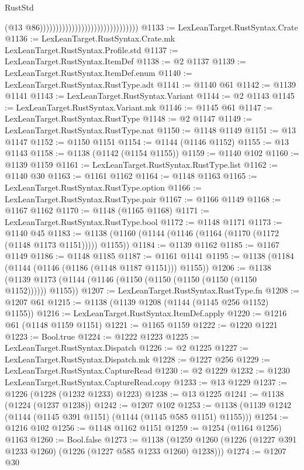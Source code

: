 \begin{lexlean}{RustStd}
\begin{coremodule}
                                                                (@13
                                                                  @86)))))))))))))))))))))))))))))))
@1133 := LexLeanTarget.RustSyntax.Crate
@1136 := LexLeanTarget.RustSyntax.Crate.mk LexLeanTarget.RustSyntax.Profile.std
@1137 := LexLeanTarget.RustSyntax.ItemDef
@1138 := @2 @1137
@1139 := LexLeanTarget.RustSyntax.ItemDef.enum
@1140 := LexLeanTarget.RustSyntax.RustType.adt
@1141 := @1140 @61
@1142 := @1139 @1141
@1143 := LexLeanTarget.RustSyntax.Variant
@1144 := @2 @1143
@1145 := LexLeanTarget.RustSyntax.Variant.mk
@1146 := @1145 @61
@1147 := LexLeanTarget.RustSyntax.RustType
@1148 := @2 @1147
@1149 := LexLeanTarget.RustSyntax.RustType.nat
@1150 := @1148 @1149
@1151 := @13 @1147
@1152 := @1150 @1151
@1154 := @1144 (@1146 @1152)
@1155 := @13 @1143
@1158 := @1138 (@1142 (@1154 @1155))
@1159 := @1140 @102
@1160 := @1139 @1159
@1161 := LexLeanTarget.RustSyntax.RustType.list
@1162 := @1140 @30
@1163 := @1161 @1162
@1164 := @1148 @1163
@1165 := LexLeanTarget.RustSyntax.RustType.option
@1166 := LexLeanTarget.RustSyntax.RustType.pair
@1167 := @1166 @1149
@1168 := @1167 @1162
@1170 := @1148 (@1165 @1168)
@1171 := LexLeanTarget.RustSyntax.RustType.bool
@1172 := @1148 @1171
@1173 := @1140 @45
@1183 := @1138 (@1160 (@1144 (@1146 (@1164 (@1170 (@1172 (@1148 @1173 @1151))))) @1155))
@1184 := @1139 @1162
@1185 := @1167 @1149
@1186 := @1148 @1185
@1187 := @1161 @1141
@1195 := @1138 (@1184 (@1144 (@1146 (@1186 (@1148 @1187 @1151))) @1155))
@1206 := @1138 (@1139 @1173 (@1144 (@1146 (@1150 (@1150 (@1150 (@1150 (@1150 @1152)))))) @1155))
@1207 := LexLeanTarget.RustSyntax.RustType.fn
@1208 := @1207 @61
@1215 := @1138 (@1139 @1208 (@1144 (@1145 @256 @1152) @1155))
@1216 := LexLeanTarget.RustSyntax.ItemDef.apply
@1220 := @1216 @61 (@1148 @1159 @1151)
@1221 := @1165 @1159
@1222 := @1220 @1221
@1223 := Bool.true
@1224 := @1222 @1223
@1225 := LexLeanTarget.RustSyntax.Dispatch
@1226 := @2 @1225
@1227 := LexLeanTarget.RustSyntax.Dispatch.mk
@1228 := @1227 @256
@1229 := LexLeanTarget.RustSyntax.CaptureRead
@1230 := @2 @1229
@1232 := @1230 LexLeanTarget.RustSyntax.CaptureRead.copy
@1233 := @13 @1229
@1237 := @1226 (@1228 (@1232 @1233) @1223)
@1238 := @13 @1225
@1241 := @1138 (@1224 (@1237 @1238))
@1242 := @1207 @102
@1253 := @1138 (@1139 @1242 (@1144 (@1145 @391 @1151) (@1144 (@1145 @585 @1151) @1155)))
@1254 := @1216 @102
@1256 := @1148 @1162 @1151
@1259 := @1254 (@1164 @1256) @1163
@1260 := Bool.false
@1273 := @1138 (@1259 @1260 (@1226 (@1227 @391 @1233 @1260) (@1226 (@1227 @585 @1233 @1260) @1238)))
@1274 := @1207 @30

\end{coremodule}
\end{lexlean}
